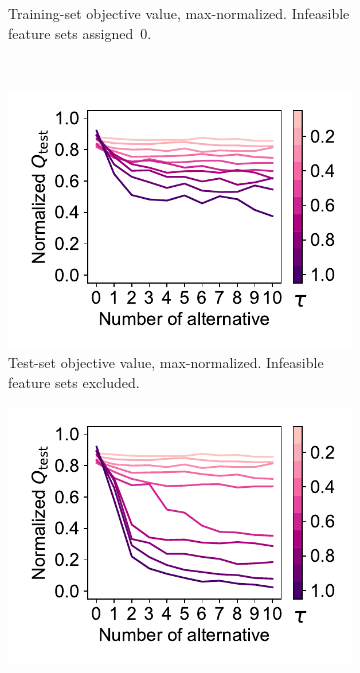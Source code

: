 \documentclass{article}
\theoremstyle{definition}
\begin{document}
\begin{figure}[p]
\begin{subfigure}[t]{0.48\textwidth}
{			Training-set objective value, max-normalized.
			Infeasible feature sets assigned~0.
		}
		\label{fig:afs:impact-num-alternatives-tau-train-objective-max-fillna}
	\end{subfigure}
	\\ \vspace{\baselineskip}
	\begin{subfigure}[t]{0.48\textwidth}
		\centering
		\includegraphics[width=\textwidth, trim=15 15 10 15, clip]{plots/impact-num-alternatives-tau-test-objective-max.pdf}
		\caption{
			Test-set objective value, max-norma\-lized.
			Infeasible feature sets excluded.
		}
		\label{fig:afs:impact-num-alternatives-tau-test-objective-max}
	\end{subfigure}
	\hfill
	\begin{subfigure}[t]{0.48\textwidth}
		\centering
		\includegraphics[width=\textwidth, trim=15 15 10 15, clip]{plots/impact-num-alternatives-tau-test-objective-max-fillna.pdf}

\end{subfigure}
\end{figure}
\end{document}
